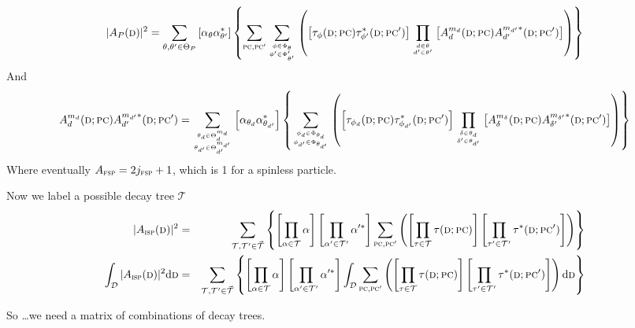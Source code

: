 \documentclass[a4paper]{article}
\newcommand{\parComb}{\ensuremath{\textsc{pc}}}
\newcommand{\dataPt}{\ensuremath{\textsc{d}}}
\newcommand{\diff}{\ensuremath{\textrm{d}}}
\newcommand{\isp}{\ensuremath{\textsc{isp}}}
\newcommand{\fsp}{\ensuremath{\textsc{fsp}}}
\newcommand{\DPC}{\ensuremath{(\dataPt; \parComb)}}
\begin{document}
\begin{equation}
  |A_{P}(\dataPt)|^2 = \sum_{\theta,\theta' \in \Theta_P} \left[\alpha_\theta\alpha^*_{\theta'}\right]\left\{ \sum_{\parComb, \parComb'} \sum_{\phi\in\Phi_\theta\atop\phi'\in\Phi'_{\theta'}} \left(\left[\tau_\phi\DPC\tau^*_{\phi'}(\dataPt;\parComb')\right]
  \prod_{d\in\theta\atop d'\in\theta'}\left[A^{m_d}_{d}\DPC A^{m_{d'}*}_{d'}(\dataPt; \parComb')\right]\right)\right\}
\end{equation}
And
\begin{equation}
  A^{m_d}_{d}\DPC A^{m_{d'}*}_{d'}(\dataPt; \parComb') =
  \sum_{\theta_d\in\Theta^{m_d}_d \atop \theta_{d'}\in\Theta^{m_{d'}}_{d'}}
      {
        \left[\alpha_{\theta_d}\alpha^*_{\theta_{d'}}\right]
        \left\{{
          \sum_{\phi_d\in\Phi_{\theta_d} \atop \phi_{d'}\in\Phi_{\theta_{d'}}}
          \left({
            \left[ \tau_{\phi_d}\DPC \tau^*_{\phi_{d'}}(\dataPt;\parComb') \right]
            \prod_{\delta\in\theta_{d} \atop \delta'\in\theta_{d'}}{
              \left[ A^{m_\delta}_\delta\DPC A^{m_{\delta'}*}_{\delta'}(\dataPt;\parComb') \right]
            }
          }\right)
        }\right\}
      }
\end{equation}
Where eventually $A_{\fsp} = 2j_{\fsp}+1$, which is 1 for a spinless particle.

\pagebreak

Now we label a possible decay tree $\mathcal{T}$
\begin{eqnarray}
  |A_{\isp}(\dataPt)|^2 & = &
  \sum_{\mathcal{T},\mathcal{T}'\in\vec{\mathcal{T}}}
  \left\{{
    \left[\prod_{\alpha\in\mathcal{T}}\alpha\right]
    \left[\prod_{\alpha'\in\mathcal{T}'}\alpha'^*\right]
    \sum_{\parComb,\parComb'}
    \left({
      \left[\prod_{\tau\in\mathcal{T}}\tau\DPC\right]
      \left[\prod_{\tau'\in\mathcal{T}'}\tau^*(\dataPt;\parComb')\right]
    }\right)
  }\right\}\\
%
  \int_{\mathcal{D}}|A_{\isp}(\dataPt)|^2\diff\dataPt & = & 
  \sum_{\mathcal{T},\mathcal{T}'\in\vec{\mathcal{T}}}
  \left\{{
    \left[\prod_{\alpha\in\mathcal{T}}\alpha\right]
    \left[\prod_{\alpha'\in\mathcal{T}'}\alpha'^*\right]
    \int_{\mathcal{D}}
    \sum_{\parComb,\parComb'}
    \left({
      \left[\prod_{\tau\in\mathcal{T}}\tau\DPC\right]
      \left[\prod_{\tau'\in\mathcal{T}'}\tau^*(\dataPt;\parComb')\right]
    }\right)
    \diff\dataPt
  }\right\}
\end{eqnarray}
  
So \dots we need a matrix of combinations of decay trees.
\end{document}
